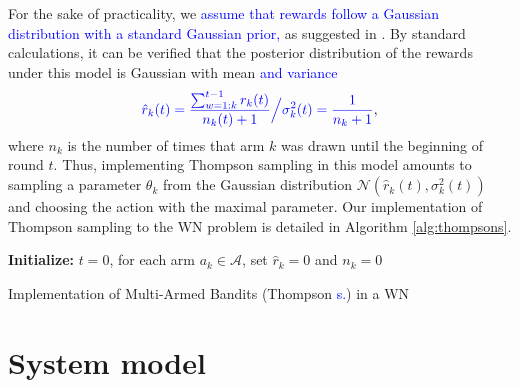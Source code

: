 \documentclass[preprint,12pt]{elsarticle}
\begin{document}
	For the sake of practicality, we \textcolor{blue}{assume that rewards follow a Gaussian distribution with a standard Gaussian prior,} as suggested in \cite{agrawal2013further}. By standard calculations, it can be verified that the posterior distribution of the rewards under this model is Gaussian with mean \textcolor{blue}{and variance}
	\begin{equation}
	\textcolor{blue}{\hat{r}_k(t) = \frac{\sum_{w=1:k}^{t-1} r_k(t) }{n_k(t) + 1} \Big/ \sigma_k^2(t) = \frac{1}{n_k + 1}},
	\nonumber
	\end{equation}
	where $n_k$ is the number of times that arm $k$ was drawn until the beginning of round $t$. Thus, implementing Thompson sampling in this model amounts to sampling a parameter $\theta_k$ from the Gaussian distribution $\mathcal{N}\left(\hat{r}_k(t),\sigma_k^2(t)\right)$ and choosing the action with the maximal parameter. Our implementation of Thompson sampling to the WN problem is detailed in Algorithm \ref{alg:thompsons}.
	
	\begin{algorithm}[]
		\SetAlgoLined
		\textbf{Initialize:} $t=0$,  for each arm $a_k \in \mathcal{A}$, set $\hat{r}_{k} = 0$ and $n_k = 0$ \\
		\caption{Implementation of Multi-Armed Bandits (Thompson \textcolor{blue}{s.}) in a WN}
		\label{alg:thompsons}
	\end{algorithm}
	
	\section{System model}
	\label{section:system_model}	
	
\end{document}
